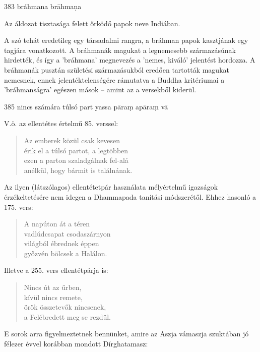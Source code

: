 
\begin{notesdescription}

\item[{383}
{bráhmana}
{brāhmaṇa}] \hfill\par

Az áldozat tisztasága felett őrködő papok neve Indiában.

A szó tehát eredetileg egy társadalmi rangra, a bráhman papok kasztjának egy tagjára vonatkozott. A bráhmanák magukat a legnemesebb származásúnak hirdették, és így a 'bráhmana' megnevezés a 'nemes, kiváló' jelentést hordozza. A bráhmanák pusztán születési származásukból eredően tartották magukat nemesnek, ennek jelentéktelenségére rámutatva a Buddha kritériumai a 'bráhmanságra' egészen mások -- amint az a versekből kiderül.

\item[{385}
{nincs számára túlsó part}
{yassa pāraṃ apāraṃ vā}] \hfill\par

V.ö. az ellentétes értelmű 85. verssel:

\begin{verse}
Az emberek közül csak kevesen\\
érik el a túlsó partot, a legtöbben\\
ezen a parton szaladgálnak fel-alá\\
anélkül, hogy bármit is találnának.
\end{verse}

Az ilyen (látszólagos) ellentétetpár használata mélyértelmű igazságok érzékeltetésére nem idegen a Dhammapada tanítási módszerétől. Ehhez hasonló a 175. vers:

\begin{verse}
A napúton át a téren\\
vadlúdcsapat csodaszárnyon\\
világból ébrednek éppen\\
győzvén bölcsek a Halálon.
\end{verse}

Illetve a 255. vers ellentétpárja is:

\begin{verse}
Nincs út az űrben,\\
kívül nincs remete,\\
örök összetevők nincsenek,\\
a Felébredett meg se rezdül.
\end{verse}

E sorok arra figyelmeztetnek bennünket, amire az Aszja vámaszja szuktában jó félezer évvel korábban mondott Dírghatamasz:


\end{notesdescription}
